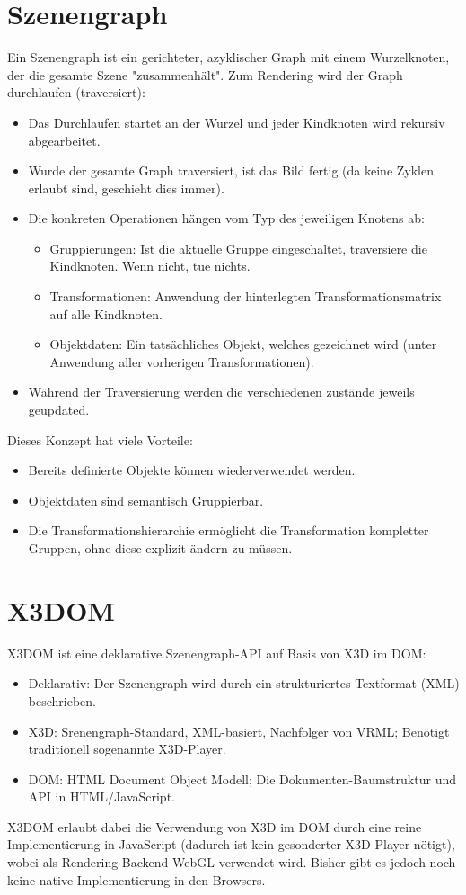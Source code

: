 	\section{Szenengraph}
		Ein Szenengraph ist ein gerichteter, azyklischer Graph mit einem Wurzelknoten, der die gesamte Szene "zusammenhält". Zum Rendering wird der Graph durchlaufen (traversiert):
		\begin{itemize}
			\item Das Durchlaufen startet an der Wurzel und jeder Kindknoten wird rekursiv abgearbeitet.
			\item Wurde der gesamte Graph traversiert, ist das Bild fertig (da keine Zyklen erlaubt sind, geschieht dies immer).
			\item Die konkreten Operationen hängen vom Typ des jeweiligen Knotens ab:
				\begin{itemize}
					\item Gruppierungen: Ist die aktuelle Gruppe eingeschaltet, traversiere die Kindknoten. Wenn nicht, tue nichts.
					\item Transformationen: Anwendung der hinterlegten Transformationsmatrix auf alle Kindknoten.
					\item Objektdaten: Ein tatsächliches Objekt, welches gezeichnet wird (unter Anwendung aller vorherigen Transformationen).
				\end{itemize}
			\item Während der Traversierung werden die verschiedenen zustände jeweils geupdated.
		\end{itemize}
		Dieses Konzept hat viele Vorteile:
		\begin{itemize}
			\item Bereits definierte Objekte können wiederverwendet werden.
			\item Objektdaten sind semantisch Gruppierbar.
			\item Die Transformationshierarchie ermöglicht die Transformation kompletter Gruppen, ohne diese explizit ändern zu müssen.
		\end{itemize}

	\section{X3DOM}
		X3DOM ist eine deklarative Szenengraph-API auf Basis von X3D im DOM:
		\begin{itemize}
			\item Deklarativ: Der Szenengraph wird durch ein strukturiertes Textformat (\zB XML) beschrieben.
			\item X3D: Srenengraph-Standard, XML-basiert, Nachfolger von VRML; Benötigt traditionell sogenannte X3D-Player.
			\item DOM: HTML Document Object Modell; Die Dokumenten-Baumstruktur und API in HTML/JavaScript.
		\end{itemize}
		X3DOM erlaubt dabei die Verwendung von X3D im DOM durch eine reine Implementierung in JavaScript (dadurch ist kein gesonderter X3D-Player nötigt), wobei als Rendering-Backend \zB WebGL verwendet wird. Bisher gibt es jedoch noch keine native Implementierung in den Browsers.

